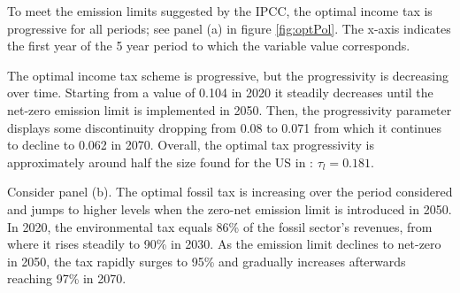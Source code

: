 \begin{figure}[h!!]
\end{figure} 

To meet the emission limits suggested by the IPCC, the optimal income tax is progressive for all periods; see panel (a) in figure \ref{fig:optPol}.  The x-axis indicates the first year of the 5 year period to which the variable value corresponds. 

The optimal income tax scheme is progressive, but the progressivity is decreasing over time. Starting from a value of 0.104 in 2020 it steadily decreases until the net-zero emission limit is implemented in 2050. Then, the progressivity parameter displays some discontinuity dropping from 0.08 to 0.071 from which it continues to decline to 0.062 in 2070.
Overall, the optimal tax progressivity is approximately  around half the size found for the US in \cite{Heathcote2017OptimalFramework}: $\tau_{l}=0.181$.


Consider panel (b). The optimal fossil tax is increasing over the period considered and jumps to higher levels when the zero-net emission limit is introduced in 2050.
In 2020, the environmental tax equals 86\% of the fossil sector's revenues, from where it rises steadily to 90\% in 2030.  As the emission limit declines to net-zero in 2050, the tax rapidly surges to 95\% and gradually increases afterwards reaching 97\% in 2070. 

